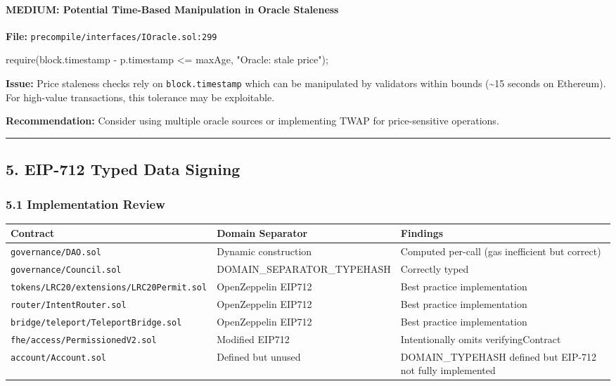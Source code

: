 \documentclass[
]{article}
\newenvironment{Shaded}{}{}
\newcommand{\NormalTok}[1]{#1}
\newcounter{none} %
\begin{document}
\paragraph{MEDIUM: Potential Time-Based Manipulation in Oracle
Staleness}\label{medium-potential-time-based-manipulation-in-oracle-staleness}

\textbf{File:} \texttt{precompile/interfaces/IOracle.sol:299}

\begin{Shaded}
\begin{Highlighting}[]
\NormalTok{require(block.timestamp {-} p.timestamp \textless{}= maxAge, "Oracle: stale price");}
\end{Highlighting}
\end{Shaded}

\textbf{Issue:} Price staleness checks rely on \texttt{block.timestamp}
which can be manipulated by validators within bounds (\textasciitilde15
seconds on Ethereum). For high-value transactions, this tolerance may be
exploitable.

\textbf{Recommendation:} Consider using multiple oracle sources or
implementing TWAP for price-sensitive operations.

\begin{center}\rule{0.5\linewidth}{0.5pt}\end{center}

\subsection{5. EIP-712 Typed Data
Signing}\label{5-eip-712-typed-data-signing}

\subsubsection{5.1 Implementation
Review}\label{51-implementation-review}

{\def\LTcaptype{none} %
\begin{longtable}[]{@{}lll@{}}
\toprule\noalign{}
Contract & Domain Separator & Findings \\
\midrule\noalign{}
\endhead
\bottomrule\noalign{}
\endlastfoot
\texttt{governance/DAO.sol} & Dynamic construction & Computed per-call
(gas inefficient but correct) \\
\texttt{governance/Council.sol} & DOMAIN\_SEPARATOR\_TYPEHASH &
Correctly typed \\
\texttt{tokens/LRC20/extensions/LRC20Permit.sol} & OpenZeppelin EIP712 &
Best practice implementation \\
\texttt{router/IntentRouter.sol} & OpenZeppelin EIP712 & Best practice
implementation \\
\texttt{bridge/teleport/TeleportBridge.sol} & OpenZeppelin EIP712 & Best
practice implementation \\
\texttt{fhe/access/PermissionedV2.sol} & Modified EIP712 & Intentionally
omits verifyingContract \\
\texttt{account/Account.sol} & Defined but unused & DOMAIN\_TYPEHASH
defined but EIP-712 not fully implemented \\
\end{longtable}
}
\end{document}
